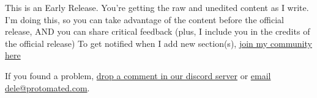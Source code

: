 \begin{warningblock}
    This is an Early Release. You're getting the raw and unedited content as I write. I'm doing this, so you can take advantage of the content
    before the official release, AND you can share critical feedback (plus, I include you in the credits of the official release)
    To get notified when I add new section(s), \href{https://discord.gg/X2USgYTB}{join my community here}
\end{warningblock}
\begin{importantblock}
    If you found a problem, \href{https://discord.gg/X2USgYTB}{drop a comment in our discord server} or  \href{mailto:dele@protomated.com}{email dele@protomated.com}.
\end{importantblock}


%
%